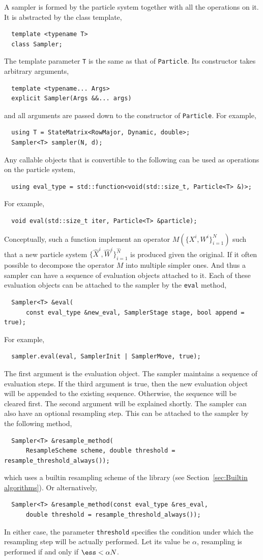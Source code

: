 A sampler is formed by the particle system together with all the operations on
it. It is abstracted by the class template,
\begin{Verbatim}
  template <typename T>
  class Sampler;
\end{Verbatim}
The template parameter \verb|T| is the same as that of \verb|Particle|. Its
constructor takes arbitrary arguments,
\begin{Verbatim}
  template <typename... Args>
  explicit Sampler(Args &&... args)
\end{Verbatim}
and all arguments are passed down to the constructor of \verb|Particle|. For
example,
\begin{Verbatim}
  using T = StateMatrix<RowMajor, Dynamic, double>;
  Sampler<T> sampler(N, d);
\end{Verbatim}
Any callable objects that is convertible to the following can be used as
operations on the particle system,
\begin{Verbatim}
  using eval_type = std::function<void(std::size_t, Particle<T> &)>;
\end{Verbatim}
For example,
\begin{Verbatim}
  void eval(std::size_t iter, Particle<T> &particle);
\end{Verbatim}
Conceptually, such a function implement an operator $M(\{X^i,W^i\}_{i=1}^N)$
such that a new particle system $\{\hat{X}^i,\hat{W}^i\}_{i=1}^{\hat{N}}$ is
produced given the original. If it often possible to decompose the operator $M$
into multiple simpler ones. And thus a sampler can have a sequence of
evaluation objects attached to it. Each of these evaluation objects can be
attached to the sampler by the \verb|eval| method,
\begin{Verbatim}
  Sampler<T> &eval(
      const eval_type &new_eval, SamplerStage stage, bool append = true);
\end{Verbatim}
For example,
\begin{Verbatim}
  sampler.eval(eval, SamplerInit | SamplerMove, true);
\end{Verbatim}
The first argument is the evaluation object. The sampler maintains a sequence
of evaluation steps. If the third argument is true, then the new evaluation
object will be appended to the existing sequence. Otherwise, the sequence will
be cleared first. The second argument will be explained shortly. The sampler
can also have an optional resampling step. This can be attached to the sampler
by the following method,
\begin{Verbatim}
  Sampler<T> &resample_method(
      ResampleScheme scheme, double threshold = resample_threshold_always());
\end{Verbatim}
which uses a builtin resampling scheme of the library (see
Section~\ref{sec:Builtin algorithms}). Or alternatively,
\begin{Verbatim}
  Sampler<T> &resample_method(const eval_type &res_eval,
      double threshold = resample_threshold_always());
\end{Verbatim}
In either case, the parameter \verb|threshold| specifies the condition under
which the resampling step will be actually performed. Let its value be
$\alpha$, resampling is performed if and only if $\ess < \alpha N$.

